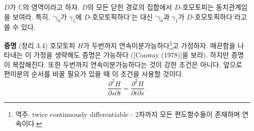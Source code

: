 \begin{salt_exercise} \label{ex-3-17}
$D$가 $\mathbb C$의 영역이라고 하자.
$D$의 모든 닫힌 경로의 집합에서 $D$-호모토피는 동치관계임을 보여라.
특히, `$\gamma_0$가 $\gamma_1$에 $D$-호모토픽하다'는 대신
`$\gamma_0$과 $\gamma_1$가 $D$-호모토픽하다'라고 쓸 수 있다.
\end{salt_exercise}

{\bf 증명} (정리 3.4)
호모토피 $H$가 두번까지 연속미분가능하다\footnote{
역주: twice continuously differentiable - 
2차까지 모든 편도함수들이 존재하며 연속이다.
}고 가정하자.
매끈함을 나타내는 이 가정을 생략해도 
증명은 가능하다 ([Conway (1978)]을 보라). %
하지만 증명이 복잡해진다. 
또한 두번까지 연속미분가능하다는 것이 강한 조건은 아니다.
앞으로 편미분의 순서를 바꿀 필요가 있을 때 이 조건을 사용할 것이다.
\[
\dfrac{\partial^2 H}{\partial s \partial t} =\dfrac{\partial^2 H}{\partial t \partial s}.
\]

